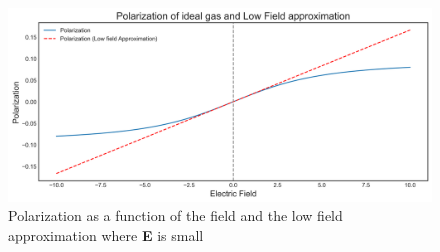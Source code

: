 \documentclass{article}
\begin{document}
\begin{appendices}
\begin{figure}[h]
\centering

\includegraphics[width=1\textwidth]{imgs/polarization.png}
\caption{Polarization as a function of the field and the low field approximation where \textbf{E} is small}
\label{img:polarization}
\end{figure}
\end{appendices}




\end{document}
